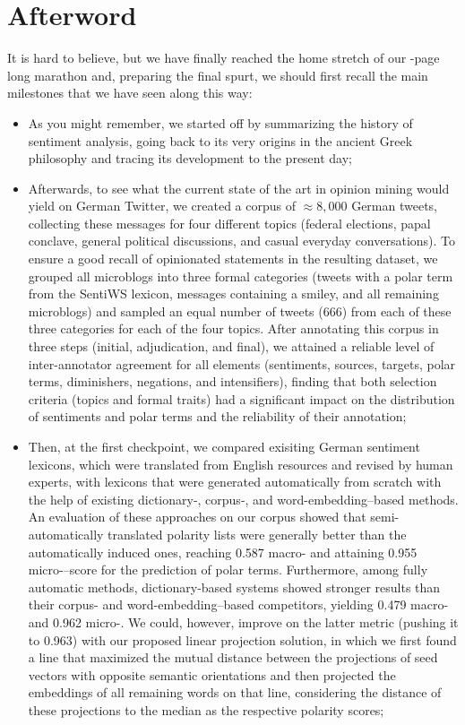 \chapter*{Afterword}

It is hard to believe, but we have finally reached the home stretch of
our \thepage-page long marathon and, preparing the final spurt, we
should first recall the main milestones that we have seen along this
way:
\begin{itemize}
\item As you might remember, we started off by summarizing the history
  of sentiment analysis, going back to its very origins in the ancient
  Greek philosophy and tracing its development to the present day;

\item Afterwards, to see what the current state of the art in opinion
  mining would yield on German Twitter, we created a corpus of
  $\approx8,000$ German tweets, collecting these messages for four
  different topics (federal elections, papal conclave, general
  political discussions, and casual everyday conversations).  To
  ensure a good recall of opinionated statements in the resulting
  dataset, we grouped all microblogs into three formal categories
  (tweets with a polar term from the SentiWS lexicon, messages
  containing a smiley, and all remaining microblogs) and sampled an
  equal number of tweets (666) from each of these three categories for
  each of the four topics.  After annotating this corpus in three
  steps (initial, adjudication, and final), we attained a reliable
  level of inter-annotator agreement for all elements (sentiments,
  sources, targets, polar terms, diminishers, negations, and
  intensifiers), finding that both selection criteria (topics and
  formal traits) had a significant impact on the distribution of
  sentiments and polar terms and the reliability of their annotation;

\item Then, at the first checkpoint, we compared exisiting German
  sentiment lexicons, which were translated from English resources and
  revised by human experts, with lexicons that were generated
  automatically from scratch with the help of existing
  dictionary\mbox{-,} corpus\mbox{-,} and word-embedding--based
  methods.  An evaluation of these approaches on our corpus showed
  that semi-automatically translated polarity lists were generally
  better than the automatically induced ones, reaching 0.587
  macro-\F{} and attaining 0.955 micro-\F{}--score for the prediction
  of polar terms.  Furthermore, among fully automatic methods,
  dictionary-based systems showed stronger results than their corpus-
  and word-embedding--based competitors, yielding 0.479 macro-\F{} and
  0.962 micro-\F{}.  We could, however, improve on the latter metric
  (pushing it to 0.963) with our proposed linear projection solution,
  in which we first found a line that maximized the mutual distance
  between the projections of seed vectors with opposite semantic
  orientations and then projected the embeddings of all remaining
  words on that line, considering the distance of these projections to
  the median as the respective polarity scores;


\end{itemize}
